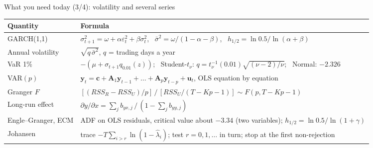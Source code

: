 \begin{frame}{What you need today (3/4): volatility and several series}
\itemsize{\small}
{\renewcommand{\arraystretch}{1.3}\begin{center}
\footnotesize
\begin{tabular}{l>{\raggedright\arraybackslash}p{9.4cm}}
\toprule
\textbf{Quantity} & \textbf{Formula} \\
\midrule
GARCH(1,1) & $\sigma_{t+1}^2 = \omega + \alpha\varepsilon_t^2 + \beta\sigma_t^2$, \ $\bar\sigma^2 = \omega/(1 - \alpha - \beta)$, \ $h_{1/2} = \ln 0.5/\ln(\alpha + \beta)$ \\
Annual volatility & $\sqrt{q\,\bar\sigma^2}$, $q$ = trading days a year \\
VaR 1\% & $-(\mu + \sigma_{t+1}q_{0.01}(z))$; \ Student-$t_\nu$: $q = t_\nu^{-1}(0.01)\sqrt{(\nu - 2)/\nu}$; \ Normal: $-2.326$ \\
VAR$(p)$ & $\mathbf y_t = \mathbf c + \mathbf A_1\mathbf y_{t-1} + \dots + \mathbf A_p\mathbf y_{t-p} + \mathbf u_t$, OLS equation by equation \\
Granger $F$ & $[(RSS_R - RSS_U)/p]\,/\,[RSS_U/(T - Kp - 1)] \sim F(p, T - Kp - 1)$ \\
Long-run effect & $\partial y/\partial x = \sum_j b_{yx,j}\,/\,(1 - \sum_j b_{yy,j})$ \\
Engle--Granger, ECM & ADF on OLS residuals, critical value about $-3.34$ (two variables); $h_{1/2} = \ln 0.5/\ln(1 + \gamma)$ \\
Johansen & trace $-T\sum_{i>r}\ln(1 - \hat\lambda_i)$; test $r = 0, 1, \dots$ in turn; stop at the first non-rejection \\
\bottomrule
\end{tabular}
\end{center}
}
\end{frame}

